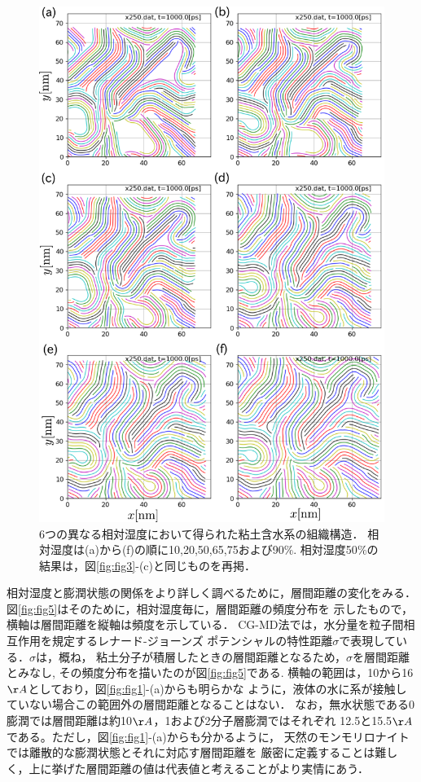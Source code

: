 \begin{figure}[h]
	\begin{center}
	\includegraphics[width=0.8\linewidth]{Figs/fig4.pdf} 
	\end{center}
	\caption{
		6つの異なる相対湿度において得られた粘土含水系の組織構造．
		相対湿度は(a)から(f)の順に10,20,50,65,75および90$\%$. 
		相対湿度50$\%$の結果は，図\ref{fig:fig3}-(c)と同じものを再掲．
	} 
	\label{fig:fig4}
\end{figure}

相対湿度と膨潤状態の関係をより詳しく調べるために，層間距離の変化をみる．
図\ref{fig:fig5}はそのために，相対湿度毎に，層間距離の頻度分布を
示したもので，横軸は層間距離を縦軸は頻度を示している．
CG-MD法では，水分量を粒子間相互作用を規定するレナード-ジョーンズ
ポテンシャルの特性距離$\sigma$で表現している．$\sigma$は，概ね，
粘土分子が積層したときの層間距離となるため，$\sigma$を層間距離とみなし,
その頻度分布を描いたのが図\ref{fig:fig5}である.
横軸の範囲は，10から16$\AA$としており，図\ref{fig:fig1}-(a)からも明らかな
ように，液体の水に系が接触していない場合この範囲外の層間距離となることはない．
なお，無水状態である0膨潤では層間距離は約10$\AA$，1および2分子層膨潤ではそれぞれ
12.5と15.5$\AA$である。ただし，図\ref{fig:fig1}-(a)からも分かるように，
天然のモンモリロナイトでは離散的な膨潤状態とそれに対応す層間距離を
厳密に定義することは難しく，上に挙げた層間距離の値は代表値と考えることがより実情にあう．

